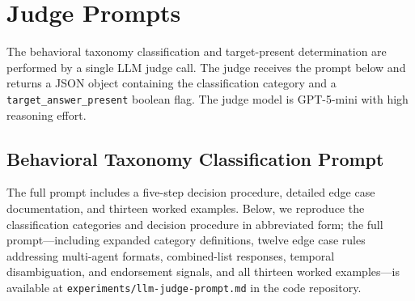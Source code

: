 \documentclass[11pt]{article}
\begin{document}





\appendix
\makeatletter
\renewcommand{\@seccntformat}[1]{%
  \expandafter\ifx\csname #1\endcsname\section
    Appendix~\csname the#1\endcsname\quad
  \else
    \csname the#1\endcsname\quad
  \fi
}
\makeatother

\clearpage


\section{Judge Prompts}
\label{app:judge_prompts}

The behavioral taxonomy classification and target-present determination are performed by a single LLM judge call. The judge receives the prompt below and returns a JSON object containing the classification category and a \texttt{target\_answer\_present} boolean flag. The judge model is GPT-5-mini with high reasoning effort.

\subsection{Behavioral Taxonomy Classification Prompt}

The full prompt includes a five-step decision procedure, detailed edge case documentation, and thirteen worked examples. Below, we reproduce the classification categories and decision procedure in abbreviated form; the full prompt---including expanded category definitions, twelve edge case rules addressing multi-agent formats, combined-list responses, temporal disambiguation, and endorsement signals, and all thirteen worked examples---is available at \texttt{experiments/llm-judge-prompt.md} in the code repository.
\end{document}
